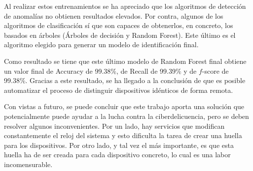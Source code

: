 Al realizar estos entrenamientos se ha apreciado que los algoritmos de detección de anomalías no obtienen resultados elevados. Por contra, algunos de los algoritmos de clasificación sí que son capaces de obtenerlos, en concreto, los basados en árboles (Árboles de decisión y Random Forest). Este último es el algoritmo elegido para generar un modelo de identificación final.

Como resultado se tiene que este último modelo de Random Forest final obtiene un valor final de Accuracy de 99.38\%, de Recall de 99.39\% y de $f$-score de 99.38\%. Gracias a este resultado, se ha llegado a la conclusión de que es posible automatizar el proceso de distinguir dispositivos idénticos de forma remota.

Con vistas a futuro, se puede concluir que este trabajo aporta una solución que potencialmente puede ayudar a la lucha contra la ciberdelicuencia, pero se deben resolver algunos inconvenientes. Por un lado, hay servicios que modifican constantemente el reloj del sistema y esto dificulta la tarea de crear una huella para los dispositivos. Por otro lado, y tal vez el más importante, es que esta huella ha de ser creada para cada dispositivo concreto, lo cual es una labor incomensurable.

